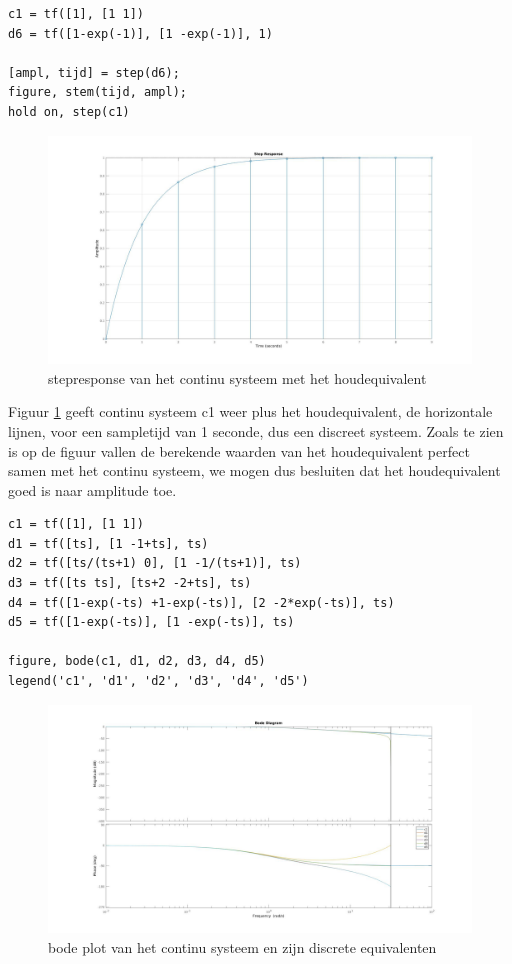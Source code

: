\documentclass[a4paper, 12pt]{article}
\begin{document}
\newpage

\begin{lstlisting}
c1 = tf([1], [1 1])
d6 = tf([1-exp(-1)], [1 -exp(-1)], 1)

[ampl, tijd] = step(d6);
figure, stem(tijd, ampl);
hold on, step(c1)
\end{lstlisting}

\begin{figure}[!h]
	\includegraphics[width=1\linewidth]{Labo3_step_response3.jpg}
	\caption{stepresponse van het continu systeem met het houdequivalent}
	\label{fig:Labo3_step_response2}
\end{figure}

Figuur \ref{fig:Labo3_step_response2} geeft	 continu systeem c1 weer plus het houdequivalent, de horizontale lijnen, voor een sampletijd van 1 seconde, dus een discreet systeem. Zoals te zien is op de figuur vallen de berekende waarden van het houdequivalent perfect samen met het continu systeem, we mogen dus besluiten dat het houdequivalent goed is naar amplitude toe.\\

\begin{lstlisting}
c1 = tf([1], [1 1])
d1 = tf([ts], [1 -1+ts], ts)
d2 = tf([ts/(ts+1) 0], [1 -1/(ts+1)], ts)
d3 = tf([ts ts], [ts+2 -2+ts], ts)
d4 = tf([1-exp(-ts) +1-exp(-ts)], [2 -2*exp(-ts)], ts)
d5 = tf([1-exp(-ts)], [1 -exp(-ts)], ts)

figure, bode(c1, d1, d2, d3, d4, d5)
legend('c1', 'd1', 'd2', 'd3', 'd4', 'd5')
\end{lstlisting}

\begin{figure}[H]
	\includegraphics[width=1\linewidth]{Labo3_bode_plot}
	\caption{bode plot van het continu systeem en zijn discrete equivalenten}
\end{figure}
\end{document}
